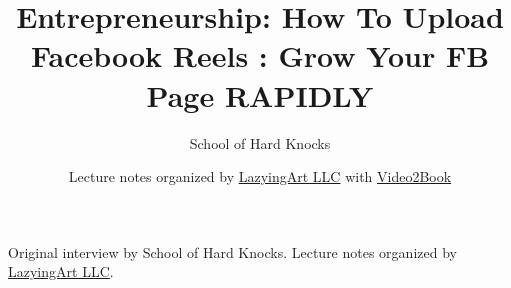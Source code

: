 \documentclass[11pt,oneside]{book}
\begin{document}
\frontmatter
\title{Entrepreneurship: How To Upload Facebook Reels : Grow Your FB Page RAPIDLY}
\author{School of Hard Knocks}
\date{Lecture notes organized by \href{https://lazying.art}{LazyingArt LLC} with \href{https://github.com/lachlanchen/Video2Book}{Video2Book}}
\maketitle
\begin{center}
\small Original interview by School of Hard Knocks. Lecture notes organized by \href{https://lazying.art}{LazyingArt LLC}.
\end{center}
\clearpage
\mainmatter

\end{document}
